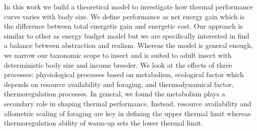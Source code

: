 In this work we build a theoretical model to investigate how thermal performance curve varies with body size.  %
We define performance as net energy gain which is the difference between total energetic gain and energetic cost. 
Our approach is similar to other as energy budget model \citep[e.g. Niche Mapper or]{Kooijman2009} but we are specifically interested in find a balance between abstraction and realism.
Whereas the model is general enough,  we narrow our taxonomic scope to insect and is suited to adult insect with deterministic body size and income breeder. 
We look at the effects of three processes: physiological processes based on metabolism, ecological factor which depends on resource availability and foraging, and thermodynamical factor, thermoregulation processes.
In general, we found the metabolism plays a secondary role in shaping thermal performance.
Instead, resource availability and allometric scaling of foraging are key in defining the upper thermal limit whereas thermoregulation ability of warm-up sets the lower thermal limit.

